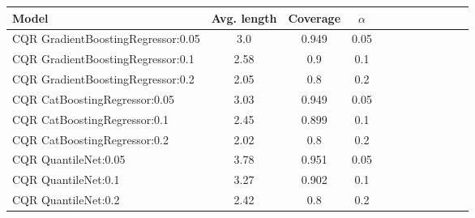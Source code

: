 \begin{table}[t] 
\centering 
\small 
\begin{tabular}{lccccccccccc} 
\toprule 
Model & Avg. length & Coverage & $\alpha$ \\ 
\midrule 
 CQR GradientBoostingRegressor:0.05 & 3.0 & 0.949 & 0.05  \\ 
 CQR GradientBoostingRegressor:0.1 & 2.58 & 0.9 & 0.1  \\ 
 CQR GradientBoostingRegressor:0.2 & 2.05 & 0.8 & 0.2  \\ 
 CQR CatBoostingRegressor:0.05 & 3.03 & 0.949 & 0.05  \\ 
 CQR CatBoostingRegressor:0.1 & 2.45 & 0.899 & 0.1  \\ 
 CQR CatBoostingRegressor:0.2 & 2.02 & 0.8 & 0.2  \\ 
 CQR QuantileNet:0.05 & 3.78 & 0.951 & 0.05  \\ 
 CQR QuantileNet:0.1 & 3.27 & 0.902 & 0.1  \\ 
 CQR QuantileNet:0.2 & 2.42 & 0.8 & 0.2  \\ 
\bottomrule 
\end{tabular} 
\end{table} 
